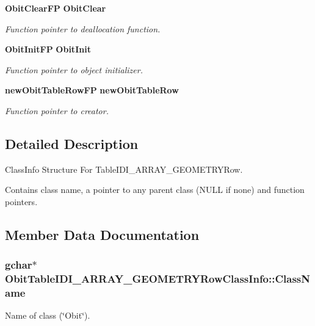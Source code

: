 \begin{CompactItemize}
{\bf Obit\-Clear\-FP} {\bf Obit\-Clear}
\begin{CompactList}\small\item\em Function pointer to deallocation function. \item\end{CompactList}\item 
{\bf Obit\-Init\-FP} {\bf Obit\-Init}
\begin{CompactList}\small\item\em Function pointer to object initializer. \item\end{CompactList}\item 
{\bf new\-Obit\-Table\-Row\-FP} {\bf new\-Obit\-Table\-Row}
\begin{CompactList}\small\item\em Function pointer to creator. \item\end{CompactList}\end{CompactItemize}


\subsection{Detailed Description}
Class\-Info Structure For Table\-IDI\_\-ARRAY\_\-GEOMETRYRow. 

Contains class name, a pointer to any parent class (NULL if none) and function pointers. 



\subsection{Member Data Documentation}
\subsubsection{\setlength{\rightskip}{0pt plus 5cm}gchar$\ast$ {\bf Obit\-Table\-IDI\_\-ARRAY\_\-GEOMETRYRow\-Class\-Info::Class\-Name}}\label{structObitTableIDI__ARRAY__GEOMETRYRowClassInfo_o2}


Name of class (\char`\"{}Obit\char`\"{}). 

